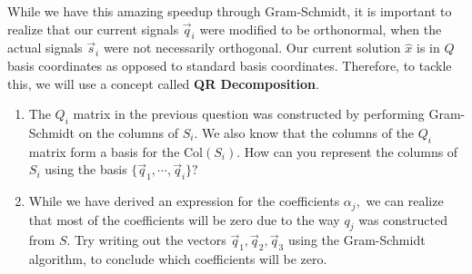 

While we have this amazing speedup through Gram-Schmidt, it is important to realize that our current signals $\vec{q}_{i}$ were modified to be orthonormal, when the actual signals $\vec{s}_{i}$ were not necessarily orthogonal. Our current solution $\hat{x}$ is in $Q$ basis coordinates as opposed to standard basis coordinates. Therefore, to tackle this, we will use a concept called \textbf{QR Decomposition}. 

\begin{enumerate}

  \item The $Q_{i}$ matrix in the previous question was constructed by performing Gram-Schmidt on the columns of $S_{i}.$
  We also know that the columns of the $Q_{i}$ matrix form a basis for the $\text{Col}(S_{i}).$ How can you represent the columns of $S_{i}$ using the basis $\{\vec{q}_{1}, \cdots, \vec{q}_{i} \}?$


  \item While we have derived an expression for the coefficients $\alpha_{j},$ we can realize that most of the coefficients will be zero due to the way $q_{j}$ was constructed from $S.$ Try writing out the vectors $\vec{q}_{1}, \vec{q}_{2}, \vec{q}_{3}$ using the Gram-Schmidt algorithm, to conclude which coefficients will be zero.


\end{enumerate}
